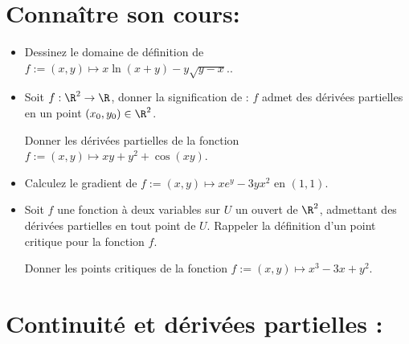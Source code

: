 \documentclass[a4paper,11pt]{article}
\theoremstyle{definition}
\begin{document}
 

\noindent{}

\smallskip
\section*{Connaître son cours:}
\begin{itemize}[$\bullet$]
	\item Dessinez le domaine de définition de $f := (x, y ) \mapsto x \ln(x + y ) - y\sqrt{y - x}.$.
	\item Soit $f:\R^2\to\R$, donner la signification de : $f$ admet des dérivées partielles en un point $(x_0,y_0)\in\R^2$.
	
	Donner les dérivées partielles de la fonction $f := (x, y ) \mapsto xy + y^2 + \cos(xy)$.
	\item Calculez le gradient de $f := (x, y ) \mapsto xe^y -3yx^2$ en $(1, 1)$.
	\item Soit $f$ une fonction à deux variables sur $U$ un ouvert de $\R^2$, admettant des dérivées partielles en tout point de $U$. Rappeler la définition d'un point critique pour la fonction $f$.
	
	Donner les points critiques de la fonction $f := (x, y ) \mapsto x^3 - 3x + y^2$. 
	

\end{itemize}
\raggedright
\smallskip
\section*{Continuité et dérivées partielles :}\hfill\\%
\smallskip
   
\end{document}

